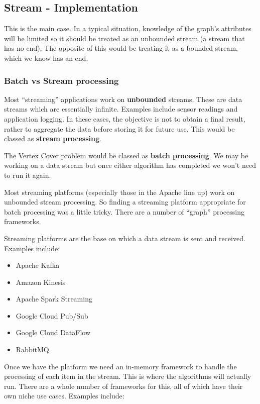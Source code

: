 \subsection{Stream - Implementation}

This is the main case. In a typical situation, knowledge of the graph's
attributes will be limited so it should be treated as an unbounded stream (a
stream that has no end). The opposite of this would be treating it as a bounded
stream, which we know has an end.

\subsubsection{Batch vs Stream processing}

Most ``streaming'' applications work on \textbf{unbounded} streams. These are
data streams which are essentially infinite. Examples include sensor readings
and application logging. In these cases, the objective is not to obtain a final
result, rather to aggregate the data before storing it for future use. This
would be classed as \textbf{stream processing}.

The Vertex Cover problem would be classed as \textbf{batch processing}. We may
be working on a data stream but once either algorithm has completed we won't
need to run it again.

Most streaming platforms (especially those in the Apache line up) work on
unbounded stream processing. So finding a streaming platform appropriate for
batch processing was a little tricky. There are a number of ``graph''
processing frameworks.

Streaming platforms are the base on which a data stream is sent and received.
Examples include:

\begin{itemize}
    \item
          Apache Kafka
    \item
          Amazon Kinesis
    \item
          Apache Spark Streaming
    \item
          Google Cloud Pub/Sub
    \item
          Google Cloud DataFlow
    \item
          RabbitMQ
\end{itemize}

Once we have the platform we need an in-memory framework to handle the
processing of each item in the stream. This is where the algorithms will
actually run. There are a whole number of frameworks for this, all of which
have their own niche use cases. Examples include:

